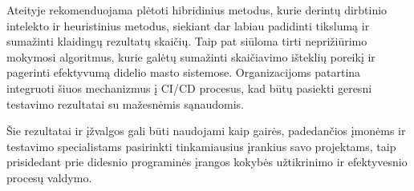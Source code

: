 \documentclass[
]{VUMIFPSkursinis}
\begin{document}
Ateityje rekomenduojama plėtoti hibridinius metodus, kurie derintų dirbtinio intelekto ir heuristinius metodus, siekiant dar labiau padidinti tikslumą ir sumažinti klaidingų rezultatų skaičių. Taip pat siūloma tirti neprižiūrimo mokymosi algoritmus, kurie galėtų sumažinti skaičiavimo išteklių poreikį ir pagerinti efektyvumą didelio masto sistemose. Organizacijoms patartina integruoti šiuos mechanizmus į CI/CD procesus, kad būtų pasiekti geresni testavimo rezultatai su mažesnėmis sąnaudomis.

Šie rezultatai ir įžvalgos gali būti naudojami kaip gairės, padedančios įmonėms ir testavimo specialistams pasirinkti tinkamiausius įrankius savo projektams, taip prisidedant prie didesnio programinės įrangos kokybės užtikrinimo ir efektyvesnio procesų valdymo.

\printbibliography  %
\end{document}

